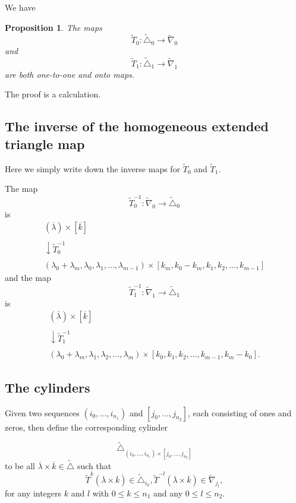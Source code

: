 \documentclass[12pt,oneside,openany]{article}
\newtheorem{prop}[theorem]{Proposition}
\begin{document}
 
We have 
\begin{prop} The maps
$$\tilde{T}_0:  \tilde{\triangle}_0 \rightarrow  \tilde{\nabla}_0$$
and
$$\tilde{T}_1:  \tilde{\triangle}_1 \rightarrow  \tilde{\nabla}_1$$
are both one-to-one and onto maps.
\end{prop}
The proof is a calculation.



\subsection{The inverse of the homogeneous extended triangle map}
Here we simply write down the inverse maps for $ \tilde{T}_0$ and $\tilde{T}_1$.

The map 
$$\tilde{T}_0^{-1}:  \tilde{\nabla}_0 \rightarrow  \tilde{\triangle}_0$$
is 
$$\begin{array}{c} (\overline{\lambda} ) \times [\overline{k}] \\
\\
\downarrow  \tilde{T}_0^{-1} \\ \\
  (\lambda_0+\lambda_m, \lambda_0, \lambda_1, \ldots, \lambda_{m-1}) \times [k_m, k_0-k_m, k_1, k_2,\ldots , k_{m-1}]
  \end{array}$$
and the 
map 
$$\tilde{T}_1^{-1}:  \tilde{\nabla}_1 \rightarrow  \tilde{\triangle}_1$$
is 
$$\begin{array}{c} (\overline{\lambda} ) \times [\overline{k}] \\
\\
\downarrow  \tilde{T}_1^{-1} \\ \\
  (\lambda_0+\lambda_m, \lambda_1, \lambda_2, \ldots, \lambda_{m}) \times [k_0, k_1, k_2,\ldots , k_{m-1}, k_m-k_0].
  \end{array}$$

\subsection{The cylinders}\label{homog cylinders}

Given two sequences $(i_0, \ldots, i_{n_1})$ and $[j_0, \ldots, j_{n_2}]$, each consisting of ones and zeros, then define the corresponding  cylinder 


$$\tilde{\triangle}_{ (i_0, \ldots, i_{n_1})\times [j_0, \ldots, j_{n_2}]   }  $$
to be all $\overline{\lambda} \times \overline{k} \in \tilde{\triangle}$ such that 
$$   \tilde{T}^k(\overline{\lambda} \times \overline{k}) \in \tilde{\triangle}_{i_k},   \tilde{T}^{-l}(\overline{\lambda} \times \overline{k}) \in \tilde{\nabla}_{j_l},$$
for any  integers $k$ and $l$ with $0\leq k \leq n_1$ and any $0\leq l \leq n_2.$
\end{document}
